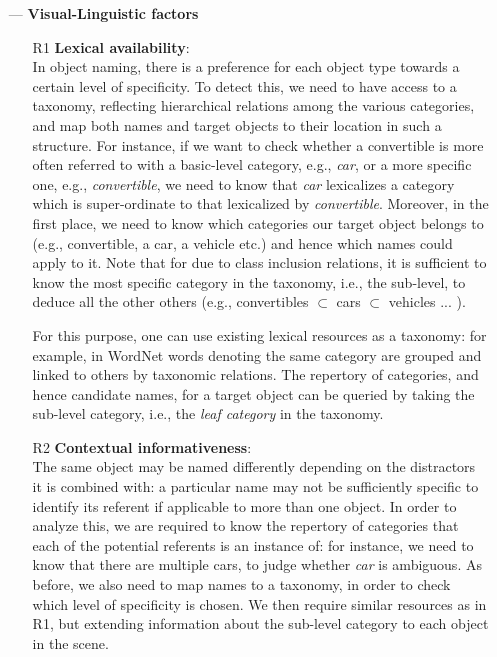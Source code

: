 \begin{itemize}
	\item[---] \textbf{Visual-Linguistic factors}
	\begin{itemize}
		\item[R1] \textbf{Lexical availability}: \\
		In object naming, there is a preference for each object type towards a certain level of specificity. To detect this, we need to have access to a taxonomy, reflecting  hierarchical relations among the various categories, and map both names and target objects to their location in such a structure. For instance, if we want to check whether a convertible is more often referred to with a basic-level category, e.g., \textit{car}, or a more specific one, e.g., \textit{convertible}, we need to know that \textit{car} lexicalizes a category which is super-ordinate to that lexicalized by \textit{convertible}. Moreover, in the first place, we need to know which categories our target object belongs to (e.g., convertible, a car, a vehicle etc.) and hence which names could apply to it. Note that for due to class inclusion relations, it is sufficient to know the most specific category in the taxonomy, i.e., the sub-level, to deduce all the other others (e.g., convertibles $\subset$ cars $\subset$ vehicles ... ).
		
		For this purpose, one can use existing lexical resources as a taxonomy: for example, in WordNet \cite{fellbaum1998wordnet} words denoting the same category are grouped and linked to others by taxonomic relations. The repertory of categories, and hence candidate names, for a target object can be queried by taking the sub-level category, i.e., the \textsl{leaf category} in the taxonomy.
		
		\item[R2] \textbf{Contextual informativeness}: \\
		The same object may be named differently depending on the distractors it is combined with: a particular name may not be sufficiently specific to identify its referent if applicable to more than one object. In order to analyze this, we are required to know the repertory of categories that each of the potential referents is an instance of: for instance, we need to know that there are multiple cars, to judge whether \textit{car} is ambiguous. As before, we also need to map names to a taxonomy, in order to check which level of specificity is chosen. We then require similar resources as in R1, but extending information about the sub-level category to each object in the scene.
				

\end{itemize}
\end{itemize}
